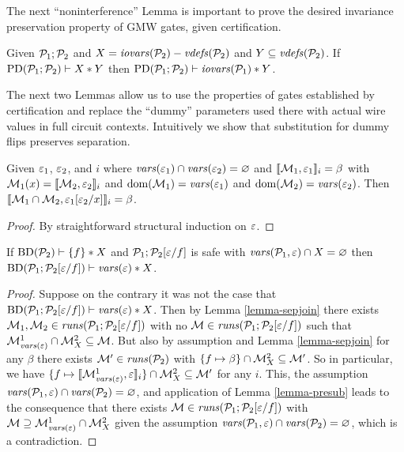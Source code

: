 The next ``noninterference'' Lemma is important to prove the desired invariance
preservation property of GMW gates, given certification.
\begin{lemma}[Noninterference]
  \label{lemma-noninterference}
  Given $\mathcal{P}_1;\mathcal{P}_2$ and $X = \mathit{iovars}(\mathcal{P}_2) - \mathit{vdefs}(\mathcal{P}_2)$ and
  $Y \subseteq \mathit{vdefs}(\mathcal{P}_2)$. If $\mathrm{PD}(\mathcal{P}_1;\mathcal{P}_2) \vdash X * Y$
  then $\mathrm{PD}(\mathcal{P}_1;\mathcal{P}_2) \vdash \mathit{iovars}(\mathcal{P}_1) * Y$.
\end{lemma}

The next two Lemmas allow us to use the properties of gates established by
certification and replace the ``dummy'' parameters used there with actual
wire values in full circuit contexts. Intuitively we show that substitution
for dummy flips preserves separation.
\begin{lemma}
  \label{lemma-presub}
  Given $\varepsilon_1$, $\varepsilon_2$, and $i$ where $\mathit{vars}(\varepsilon_1) \cap
  \mathit{vars}(\varepsilon_2) = \varnothing$ and $\llbracket \mathcal{M}_1,\varepsilon_1 \rrbracket_{i} = \beta$
  with $\mathcal{M}_1(x) = \llbracket \mathcal{M}_2,\varepsilon_2 \rrbracket_{i}$ and
  $\mathrm{dom}(\mathcal{M}_1) = \mathit{vars}(\varepsilon_1)$ and $\mathrm{dom}(\mathcal{M}_2) = \mathit{vars}(\varepsilon_2)$.
  Then $\llbracket \mathcal{M}_1\cap\mathcal{M}_2,\varepsilon_1[\varepsilon_2/x] \rrbracket_{i} = \beta$.
\end{lemma}
\begin{proof}
By straightforward structural induction on $\varepsilon$.
\end{proof}

\begin{lemma}[Substitution]
  \label{lemma-substitution}
  If $\mathrm{BD}(\mathcal{P}_2) \vdash \{ f \} * X$ and
  $\mathcal{P}_1;\mathcal{P}_2[\varepsilon/f]$ is safe with $\mathit{vars}(\mathcal{P}_1,\varepsilon) \cap
  X = \varnothing$ then
  $\mathrm{BD}(\mathcal{P}_1;\mathcal{P}_2[\varepsilon/f]) \vdash \mathit{vars}(\varepsilon) * X$.
\end{lemma}
\begin{proof}
  Suppose on the contrary it was not the case that
  $\mathrm{BD}(\mathcal{P}_1;\mathcal{P}_2[\varepsilon/f]) \vdash \mathit{vars}(\varepsilon) * X$.
  Then by Lemma \ref{lemma-sepjoin} there exists $\mathcal{M}_1,\mathcal{M}_2
  \in \mathit{runs}(\mathcal{P}_1;\mathcal{P}_2[\varepsilon/f])$ with no $\mathcal{M} \in
  \mathit{runs}(\mathcal{P}_1;\mathcal{P}_2[\varepsilon/f])$ such that $\mathcal{M}^1_{\mathit{vars}(\varepsilon)}
  \cap \mathcal{M}^2_X \subseteq \mathcal{M}$.  But also by
  assumption and Lemma \ref{lemma-sepjoin} for any $\beta$ there
  exists $\mathcal{M}' \in \mathit{runs}(\mathcal{P}_2)$ with $\{ f \mapsto \beta \} \cap
  \mathcal{M}^2_X \subseteq \mathcal{M}'$. So in particular, we
  have $\{ f \mapsto \llbracket \mathcal{M}^1_{\mathit{vars}(\varepsilon)},\varepsilon \rrbracket_{i} \} \cap
  \mathcal{M}^2_X \subseteq \mathcal{M}'$ for any $i$. This, the
  assumption $\mathit{vars}(\mathcal{P}_1,\varepsilon) \cap \mathit{vars}(\mathcal{P}_2) = \varnothing$,
  and application of Lemma \ref{lemma-presub} leads to the consequence
  that there exists $\mathcal{M} \in \mathit{runs}(\mathcal{P}_1;\mathcal{P}_2[\varepsilon/f])$ with
  $\mathcal{M} \supseteq \mathcal{M}^1_{\mathit{vars}(\varepsilon)} \cap
  \mathcal{M}^2_X$ given the assumption $\mathit{vars}(\mathcal{P}_1,\varepsilon)
  \cap \mathit{vars}(\mathcal{P}_2) = \varnothing$, which is a contradiction.
\end{proof}

